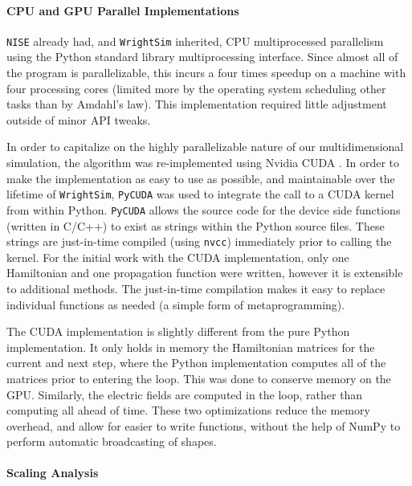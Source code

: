 \hypertarget{cpu-and-gpu-parallel-implementations}{%
\paragraph{CPU and GPU Parallel
Implementations}\label{cpu-and-gpu-parallel-implementations}}

\texttt{NISE} already had, and \texttt{WrightSim} inherited, CPU
multiprocessed parallelism using the Python standard library
multiprocessing interface. Since almost all of the program is
parallelizable, this incurs a four times speedup on a machine with four
processing cores (limited more by the operating system scheduling other
tasks than by Amdahl's law). This implementation required little
adjustment outside of minor API tweaks.

In order to capitalize on the highly parallelizable nature of our
multidimensional simulation, the algorithm was re-implemented using
Nvidia CUDA \cite{Nickolls_2008}. In order to make the implementation
as easy to use as possible, and maintainable over the lifetime of
\texttt{WrightSim}, \texttt{PyCUDA} \cite{Klockner_2012} was used to
integrate the call to a CUDA kernel from within Python. \texttt{PyCUDA}
allows the source code for the device side functions (written in C/C++)
to exist as strings within the Python source files. These strings are
just-in-time compiled (using \texttt{nvcc}) immediately prior to calling
the kernel. For the initial work with the CUDA implementation, only one
Hamiltonian and one propagation function were written, however it is
extensible to additional methods. The just-in-time compilation makes it
easy to replace individual functions as needed (a simple form of
metaprogramming).

The CUDA implementation is slightly different from the pure Python
implementation. It only holds in memory the Hamiltonian matrices for the
current and next step, where the Python implementation computes all of
the matrices prior to entering the loop. This was done to conserve
memory on the GPU. Similarly, the electric fields are computed in the
loop, rather than computing all ahead of time. These two optimizations
reduce the memory overhead, and allow for easier to write functions,
without the help of NumPy to perform automatic broadcasting of shapes.

\hypertarget{scaling-analysis}{%
\paragraph{Scaling Analysis}\label{scaling-analysis}}

